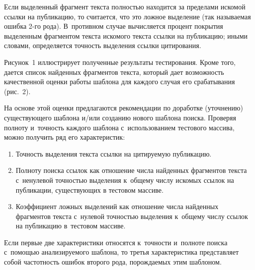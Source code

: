 \begin{multicols}{2}


\noindent
Если выделен\-ный
  фрагмент текста полностью  находится
 за пределами искомой ссылки на публикацию, то считается, что это
ложное выделение (так называемая ошибка 2-го рода). В~противном случае вы\-чис\-ля\-ет\-ся
процент покрытия выделенным фрагментом текс\-та искомого текста ссылки на
пуб\-ли\-кацию;
иными словами, определяется точность выделения ссылки цитирования.

Рисунок~1
иллюстрирует полученные результаты тестирования. Кроме того, дается список найденных
фрагментов текста, который дает возможность качественной оценки работы шаблона для
каждого случая его срабатывания (рис.~2).



  На основе этой оценки предлагаются рекомендации по доработке (уточнению)
существующего шаблона и/или созданию нового шаблона поиска. Проверяя
полноту и~точность каждого шаблона с~использованием тестового массива, можно получить ряд его
характеристик:
  \begin{enumerate}[1.]
\item Точность выделения текста ссылки на цитиру\-емую публикацию.

\columnbreak

\item Полноту поиска ссылок как отношение числа найденных фрагментов
текста с~ненулевой точностью выделения к~общему числу искомых ссылок на публикации, существующих
в тестовом мас\-сиве.
\item Коэффициент ложных выделений как отношение числа найденных фрагментов
текста с~нулевой точностью выделения к~общему числу ссылок на публикацию в~тестовом массиве.
\end{enumerate}

  Если первые две характеристики относятся к~точности и~полноте поиска с~помощью
анализируемого шаблона, то третья характеристика представляет собой частотность ошибок
второго рода, порождаемых этим шаблоном.

\begin{figure*} %
 \vspace*{1pt}
 \begin{center}
 \mbox{%
 \epsfxsize=156.768mm
 }
\end{center}
 \vspace*{-9pt}
 \vspace*{14pt}
 \begin{center}
 \mbox{%
 \epsfxsize=156.768mm
 }
\end{center}
 \vspace*{-9pt}
\end{figure*}


\end{multicols}

